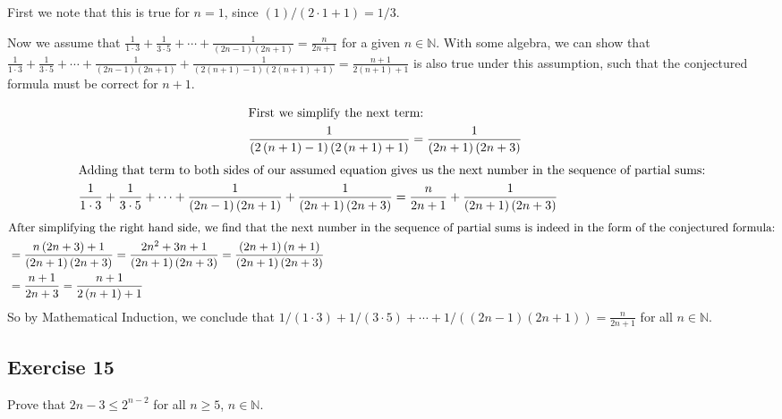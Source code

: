 \documentclass[12pt]{article}
\begin{document}
First we note that this is true for $n = 1$, since $\left(1\right)/\left(2 \cdot 1 + 1\right) = 1/3$.

Now we assume that $\frac{1}{1 \cdot 3} + \frac{1}{3 \cdot 5} + \cdots + \frac{1}{\left(2n - 1\right)\left(2n + 1\right)} = \frac{n}{2n + 1}$ for a given $n \in \mathbb{N}$. With some algebra, we can show that $\frac{1}{1 \cdot 3} + \frac{1}{3 \cdot 5} + \cdots + \frac{1}{\left(2n - 1\right)\left(2n + 1\right)} + \frac{1}{\left(2\left(n + 1\right) - 1\right)\left(2\left(n + 1\right) + 1\right)} = \frac{n + 1}{2\left(n + 1\right) + 1}$ is also true under this assumption, such that the conjectured formula must be correct for $n + 1$.

\begin{align*}
\intertext{First we simplify the next term:}
\frac{1}{\left(2\left(n + 1\right) - 1\right)\left(2\left(n + 1\right) + 1\right)} &= \frac{1}{\left(2n + 1\right)\left(2n + 3\right)}
\end{align*}
\begin{align*}
\intertext{Adding that term to both sides of our assumed equation gives us the next number in the sequence of partial sums:}
\frac{1}{1 \cdot 3} + \frac{1}{3 \cdot 5} + \cdots + \frac{1}{\left(2n - 1\right)\left(2n + 1\right)} + \frac{1}{\left(2n + 1\right)\left(2n + 3\right)} &= \frac{n}{2n + 1} + \frac{1}{\left(2n + 1\right)\left(2n + 3\right)} \\
\end{align*}
\begin{align*}
\intertext{After simplifying the right hand side, we find that the next number in the sequence of partial sums is indeed in the form of the conjectured formula:}
&= \frac{n\left(2n + 3\right) + 1}{\left(2n + 1\right)\left(2n + 3\right)}
= \frac{2n^2 + 3n + 1}{\left(2n + 1\right)\left(2n + 3\right)}
= \frac{\left(2n + 1\right)\left(n + 1\right)}{\left(2n + 1\right)\left(2n + 3\right)} \\
&= \frac{n + 1}{2n + 3} = \frac{n + 1}{2\left(n + 1\right) + 1}
\end{align*}
So by Mathematical Induction, we conclude that $1/\left(1\cdot 3\right) + 1/\left(3 \cdot 5\right) + \cdots + 1 /\left(\left(2n - 1\right)\left(2n+1\right)\right) = \frac{n}{2n + 1}$ for all $n \in \mathbb{N}$.

\subsection*{Exercise 15}
Prove that $2n - 3 \leq 2^{n-2}$ for all $n \geq 5$, $n \in \mathbb{N}$.
\end{document}
